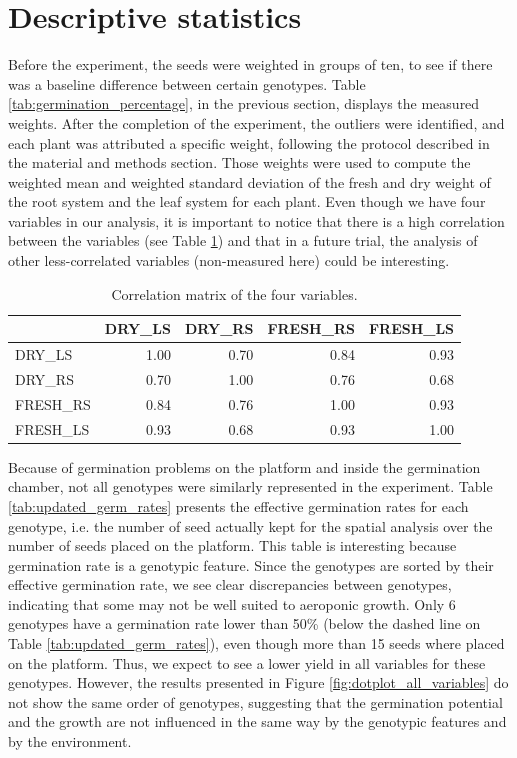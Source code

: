 \section{Descriptive statistics}
Before the experiment, the seeds were weighted in groups of ten, to see if there was a baseline difference between certain genotypes. Table \ref{tab:germination_percentage}, in the previous section, displays the measured weights.
After the completion of the experiment, the outliers were identified, and each plant was attributed a specific weight, following the protocol described in the material and methods section. Those weights were used to compute the weighted mean and weighted standard deviation of the fresh and dry weight of the root system and the leaf system for each plant. Even though we have four variables in our analysis, it is important to notice that there is a high correlation between the variables (see Table \ref{tab:var_correlation}) and that in a future trial, the analysis of other less-correlated variables (non-measured here) could be interesting.\\

\begin{table}[ht]
\centering
 \caption{Correlation matrix of the four variables.}
\begin{tabular}{lrrrr}
  \hline
 & DRY\_LS & DRY\_RS & FRESH\_RS & FRESH\_LS \\ 
  \hline
DRY\_LS & 1.00 & 0.70 & 0.84 & 0.93 \\ 
  DRY\_RS & 0.70 & 1.00 & 0.76 & 0.68 \\ 
  FRESH\_RS & 0.84 & 0.76 & 1.00 & 0.93 \\ 
  FRESH\_LS & 0.93 & 0.68 & 0.93 & 1.00 \\ 
   \hline
\end{tabular}
\label{tab:var_correlation}
\end{table}

Because of germination problems on the platform and inside the germination chamber, not all genotypes were similarly represented in the experiment. Table \ref{tab:updated_germ_rates} presents the effective germination rates for each genotype, i.e. the number of seed actually kept for the spatial analysis over the number of seeds placed on the platform. This table is interesting because germination rate is a genotypic feature. Since the genotypes are sorted by their effective germination rate, we see clear discrepancies between genotypes, indicating that some may not be well suited to aeroponic growth. Only 6 genotypes have a germination rate lower than 50\% (below the dashed line on Table \ref{tab:updated_germ_rates}), even though more than 15 seeds where placed on the platform. Thus, we expect to see a lower yield in all variables for these genotypes. However, the results presented in Figure \ref{fig:dotplot_all_variables} do not show the same order of genotypes, suggesting that the germination potential and the growth are not influenced in the same way by the genotypic features and by the environment.\\


